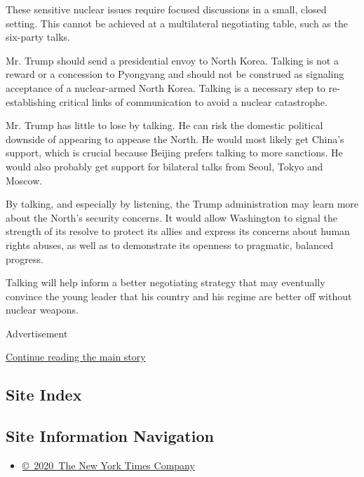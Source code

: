 These sensitive nuclear issues require focused discussions in a small,
closed setting. This cannot be achieved at a multilateral negotiating
table, such as the six-party talks.

Mr. Trump should send a presidential envoy to North Korea. Talking is
not a reward or a concession to Pyongyang and should not be construed as
signaling acceptance of a nuclear-armed North Korea. Talking is a
necessary step to re-establishing critical links of communication to
avoid a nuclear catastrophe.

Mr. Trump has little to lose by talking. He can risk the domestic
political downside of appearing to appease the North. He would most
likely get China's support, which is crucial because Beijing prefers
talking to more sanctions. He would also probably get support for
bilateral talks from Seoul, Tokyo and Moscow.

By talking, and especially by listening, the Trump administration may
learn more about the North's security concerns. It would allow
Washington to signal the strength of its resolve to protect its allies
and express its concerns about human rights abuses, as well as to
demonstrate its openness to pragmatic, balanced progress.

Talking will help inform a better negotiating strategy that may
eventually convince the young leader that his country and his regime are
better off without nuclear weapons.

Advertisement

\protect\hyperlink{after-bottom}{Continue reading the main story}

\hypertarget{site-index}{%
\subsection{Site Index}\label{site-index}}

\hypertarget{site-information-navigation}{%
\subsection{Site Information
Navigation}\label{site-information-navigation}}

\begin{itemize}
\tightlist
\item
  \href{https://help.nytimes.com/hc/en-us/articles/115014792127-Copyright-notice}{©~2020~The
  New York Times Company}
\end{itemize}

